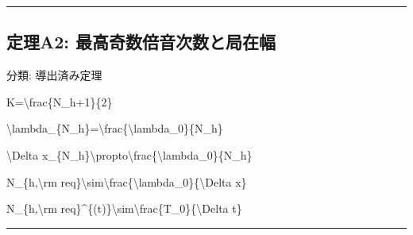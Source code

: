 \documentclass[
  a4paper,
]{ltjsarticle}
\newenvironment{Shaded}{}{}
\newcommand{\NormalTok}[1]{#1}
\begin{document}
\begin{center}\rule{0.5\linewidth}{0.5pt}\end{center}

\subsection{定理A2:
最高奇数倍音次数と局在幅}\label{ux5b9aux7406a2-ux6700ux9ad8ux5947ux6570ux500dux97f3ux6b21ux6570ux3068ux5c40ux5728ux5e45}

分類: 導出済み定理

\begin{Shaded}
\begin{Highlighting}[]
\NormalTok{K=\textbackslash{}frac\{N\_h+1\}\{2\}}
\end{Highlighting}
\end{Shaded}

\begin{Shaded}
\begin{Highlighting}[]
\NormalTok{\textbackslash{}lambda\_\{N\_h\}=\textbackslash{}frac\{\textbackslash{}lambda\_0\}\{N\_h\}}
\end{Highlighting}
\end{Shaded}

\begin{Shaded}
\begin{Highlighting}[]
\NormalTok{\textbackslash{}Delta x\_\{N\_h\}\textbackslash{}propto\textbackslash{}frac\{\textbackslash{}lambda\_0\}\{N\_h\}}
\end{Highlighting}
\end{Shaded}

\begin{Shaded}
\begin{Highlighting}[]
\NormalTok{N\_\{h,\textbackslash{}rm req\}\textbackslash{}sim\textbackslash{}frac\{\textbackslash{}lambda\_0\}\{\textbackslash{}Delta x\}}
\end{Highlighting}
\end{Shaded}

\begin{Shaded}
\begin{Highlighting}[]
\NormalTok{N\_\{h,\textbackslash{}rm req\}\^{}\{(t)\}\textbackslash{}sim\textbackslash{}frac\{T\_0\}\{\textbackslash{}Delta t\}}
\end{Highlighting}
\end{Shaded}

\begin{center}\rule{0.5\linewidth}{0.5pt}\end{center}
\end{document}
